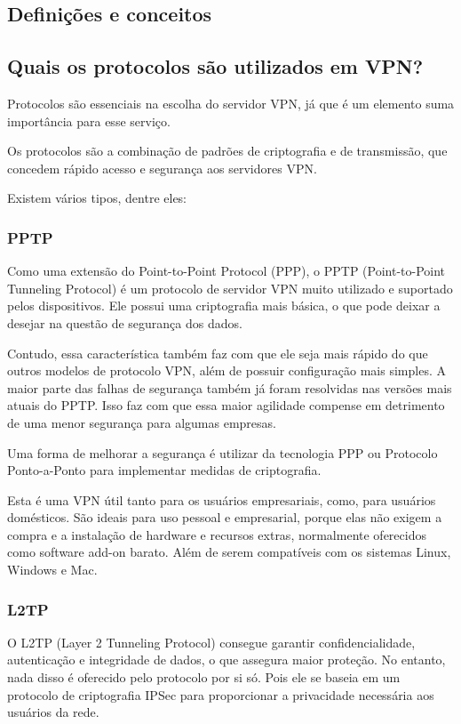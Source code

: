 \documentclass[12pt]{article}
\begin{document}
\begin{flushleft}

\section{Definições e conceitos}

\subsection{Quais os protocolos são utilizados em VPN?}

Protocolos são essenciais na escolha do servidor VPN, já que é um elemento suma importância para esse serviço. 

Os protocolos são a combinação de padrões de criptografia e de transmissão, que concedem rápido acesso e segurança aos servidores VPN.

Existem vários tipos, dentre eles:


\subsubsection{PPTP}
Como uma extensão do Point-to-Point Protocol (PPP), o PPTP (Point-to-Point Tunneling Protocol) é um protocolo de servidor VPN muito utilizado e suportado pelos dispositivos. Ele possui uma criptografia mais básica, o que pode deixar a desejar na questão de segurança dos dados. 

Contudo, essa característica também faz com que ele seja mais rápido do que outros modelos de protocolo VPN, além de possuir configuração mais simples. A maior parte das falhas de segurança também já foram resolvidas nas versões mais atuais do PPTP. Isso faz com que essa maior agilidade compense em detrimento de uma menor segurança para algumas empresas.

Uma forma de melhorar a segurança é utilizar da tecnologia PPP ou Protocolo Ponto-a-Ponto para implementar medidas de criptografia.

Esta é uma VPN útil tanto para os usuários empresariais, como, para usuários domésticos. São ideais para uso pessoal e empresarial, porque elas não exigem a compra e a instalação de hardware e recursos extras, normalmente oferecidos como software add-on barato. Além de serem compatíveis com os sistemas Linux, Windows e Mac.

\subsubsection{L2TP}
O L2TP (Layer 2 Tunneling Protocol) consegue garantir confidencialidade, autenticação e integridade de dados, o que assegura maior proteção. No entanto, nada disso é oferecido pelo protocolo por si só. Pois ele se baseia em um protocolo de criptografia IPSec para proporcionar a privacidade necessária aos usuários da rede.


\end{flushleft}
\end{document}

